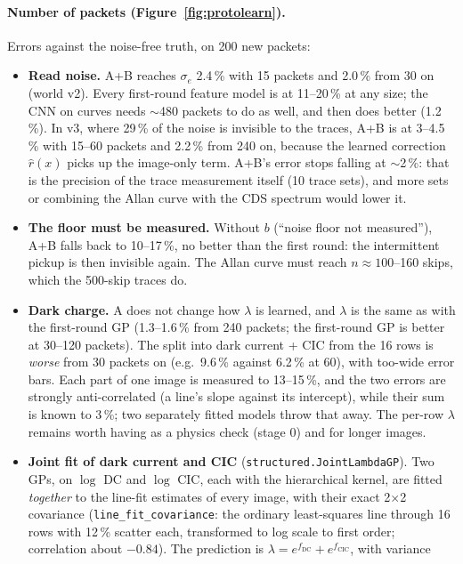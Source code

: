 \documentclass[10pt]{article}
\newcommand{\code}[1]{\texttt{#1}}
\begin{document}
\paragraph{Number of packets (Figure~\ref{fig:protolearn}).} Errors against the noise-free truth, on 200 new packets:
\begin{itemize}
\item \textbf{Read noise.} A+B reaches $\sigma_e$ 2.4\,\% with 15 packets and 2.0\,\% from 30 on (world v2). Every first-round feature
  model is at 11--20\,\% at any size; the CNN on curves needs $\sim$480 packets to do as well, and then does better (1.2\,\%). In v3, where
  29\,\% of the noise is invisible to the traces, A+B is at 3--4.5\,\% with 15--60 packets and 2.2\,\% from 240 on, because the learned
  correction $\hat r(x)$ picks up the image-only term. A+B's error stops falling at $\sim$2\,\%: that is the precision of the trace
  measurement itself (10 trace sets), and more sets or combining the Allan curve with the CDS spectrum would lower it.
\item \textbf{The floor must be measured.} Without $b$ (``noise floor not measured''), A+B falls back to 10--17\,\%, no better than the first
  round: the intermittent pickup is then invisible again. The Allan curve must reach $n \approx 100$--160 skips, which the 500-skip
  traces do.
\item \textbf{Dark charge.} A does not change how $\lambda$ is learned, and $\lambda$ is the same as with the first-round GP (1.3--1.6\,\% from
  240 packets; the first-round GP is better at 30--120 packets). The split into dark current + CIC from the 16 rows is \emph{worse} from 30
  packets on (e.g.\ 9.6\,\% against 6.2\,\% at 60), with too-wide error bars. Each part of one image is measured to 13--15\,\%, and the two errors are strongly anti-correlated (a
  line's slope against its intercept), while their sum is known to 3\,\%; two separately fitted models throw that away. The
  per-row $\lambda$ remains worth having as a physics check (stage 0) and for longer images.
\item \textbf{Joint fit of dark current and CIC} (\code{structured.JointLambdaGP}). Two GPs, on $\log$ DC and $\log$ CIC, each with the
  hierarchical kernel, are fitted \emph{together} to the line-fit estimates of every image, with their exact 2$\times$2 covariance
  (\code{line\_fit\_covariance}: the ordinary least-squares line through 16 rows with 12\,\% scatter each, transformed to log scale to
  first order; correlation about $-0.84$). The prediction is $\lambda = e^{f_\text{DC}} + e^{f_\text{CIC}}$, with variance

\end{itemize}
\end{document}
